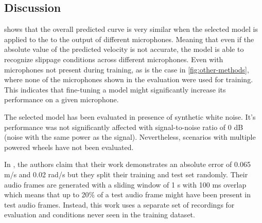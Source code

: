 \subsection{Discussion} \label{subsec:discussion}

 shows that the overall predicted curve is very similar
when the selected model is applied to the to the output of different
microphones. Meaning that even if the absolute value of the predicted velocity
is not accurate, the model is able to recognize slippage conditions across
different microphones. Even with microphones not present during training, as is
the case in \cref{fig:other-methods}, where none of the microphones shown in
the evaluation were used for training. This indicates that fine-tuning
\cite{TL2016} a model might significantly increase its performance on a given
microphone. 




The selected model has been evaluated in presence of synthetic white noise.
It's performance was not significantly affected with signal-to-noise ratio of 0
dB (noise with the same power as the signal). Nevertheless, scenarios with
multiple powered wheels have not been evaluated. 


In  \cite{marchegiani2018a}, the authors claim that
their work demonstrates an absolute error of 0.065 m/s and 0.02 rad/s but they
split their training and test set randomly. Their audio frames are generated
with a sliding window of 1 s with 100 ms overlap which means that up to 20\% of
a test audio frame might have been present in test audio frames. Instead, this
work uses a separate set of recordings for evaluation and conditions never seen
in the training dataset.

